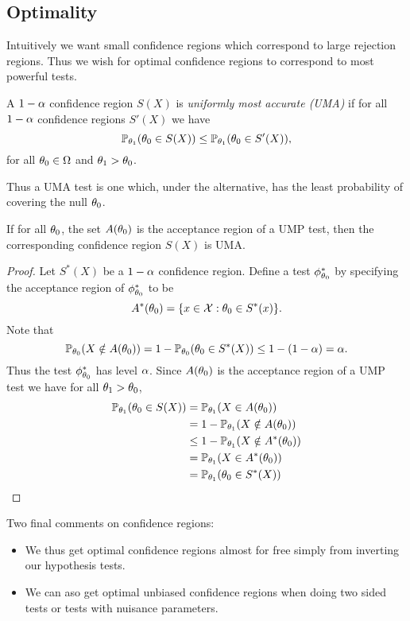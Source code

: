 \subsection{Optimality}
Intuitively we want small confidence regions which correspond to large rejection regions. Thus we wish for optimal confidence regions to correspond to most powerful tests.
\begin{defn}
    A $1-{\alpha}$ confidence region $S(X)$ is \emph{uniformly most accurate (UMA)} if for all $1-{\alpha}$ confidence regions $S'(X)$ we have
    \[{\mathbb{P}}_{{\theta}_1}({\theta}_0 \in S(X)) \le {\mathbb{P}}_{{\theta}_1}({\theta}_0 \in S'(X)), \]
    for all ${\theta}_0 \in {{\Omega}}$ and ${\theta}_1 > {\theta}_0$.
\end{defn}
Thus a UMA test is one which, under the alternative, has the least probability of covering the null ${\theta}_0$. 
\begin{prop}
    If for all ${\theta}_0$, the set $A({\theta}_0)$ is the acceptance region of a UMP test, then the corresponding confidence region $S(X)$ is UMA.
\end{prop}
\begin{proof}
    Let $S^*(X)$ be a $1-{\alpha}$ confidence region. Define a test $\phi^*_{{\theta}_0}$ by specifying the acceptance region of $\phi^*_{{\theta}_0}$ to be 
    \[A^*({\theta}_0) = \{x \in {\mathcal{X}} : {\theta}_0 \in S^*(x)\}. \]
    Note that 
    \[{\mathbb{P}}_{{\theta}_0}(X \notin A({\theta}_0)) = 1-{\mathbb{P}}_{{\theta}_0}({\theta}_0 \in S^*(X)) \le 1-(1-{\alpha})={\alpha}. \]
    Thus the test $\phi^*_{{\theta}_0}$ has level ${\alpha}$. Since $A({\theta}_0)$ is the acceptance region of a UMP test we have for all ${\theta}_1 > {\theta}_0$,
    \begin{align*}
        {\mathbb{P}}_{{\theta}_1}({\theta}_0 \in S(X)) &= {\mathbb{P}}_{{\theta}_1}(X \in A({\theta}_0))\\
        &=1-{\mathbb{P}}_{{\theta}_1}(X \notin A({\theta}_0))\\
        &\le 1-{\mathbb{P}}_{{\theta}_1}(X \notin A^*({\theta}_0))\\
        &={\mathbb{P}}_{{\theta}_1}(X \in A^*({\theta}_0))\\
        &= {\mathbb{P}}_{{\theta}_1}({\theta}_0 \in S^*(X)) \qedhere        
    \end{align*}
\end{proof}
\begin{remark}
    Two final comments on confidence regions:
    \begin{itemize}
        \item We thus get optimal confidence regions almost for free simply from inverting our hypothesis tests.
        \item We can aso get optimal unbiased confidence regions when doing two sided tests or tests with nuisance parameters.
    \end{itemize}
\end{remark}
